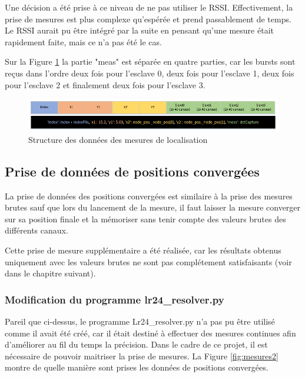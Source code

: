 Une décision a été prise à ce niveau de ne pas utiliser le RSSI. Effectivement, la prise de mesures est plus complexe qu'espérée et prend passablement de temps. Le RSSI aurait pu être intégré par la suite en pensant qu'une mesure était rapidement faite, mais ce n'a pas été le cas. 

Sur la Figure \ref{fig:dataStruct} la partie "meas" est séparée en quatre parties, car les bursts sont reçus dans l'ordre deux fois pour l'esclave 0, deux fois pour l'esclave 1, deux fois pour l'esclave 2 et finalement deux fois pour l'esclave 3. 

\begin{figure}[htp]
 \begin{center}
  \includegraphics[scale=0.7]{figures/dataStruct.png}
  \caption{Structure des données des mesures de localisation}
  \label{fig:dataStruct} %
 \end{center}
\end{figure}

\subsection{Prise de données de positions convergées}
La prise de données des positions convergées est similaire à la prise des mesures brutes sauf que lors du lancement de la mesure, il faut laisser la mesure converger sur sa position finale et la mémoriser sans tenir compte des valeurs brutes des différents canaux.

Cette prise de mesure supplémentaire a été réalisée, car les résultats obtenus uniquement avec les valeurs brutes ne sont pas complétement satisfaisants (voir dans le chapitre suivant). 

\subsubsection{Modification du programme lr24\_resolver.py}
Pareil que ci-dessus, le programme Lr24\_resolver.py n'a pas pu être utilisé comme il avait été créé, car il était destiné à effectuer des mesures continues afin d'améliorer au fil du temps la précision. Dans le cadre de ce projet, il est nécessaire de pouvoir maitriser la prise de mesures. La Figure \ref{fig:mesures2} montre de quelle manière sont prises les données de positions convergées.

